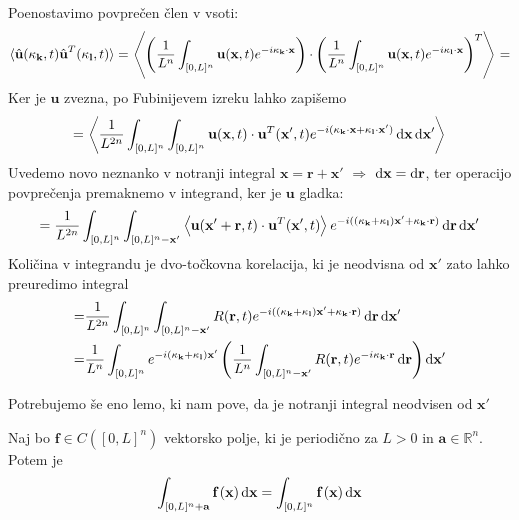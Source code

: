 \documentclass[mat2, tisk]{fmfdelo}
\newcommand{\R}{\mathbb R}
\newcommand{\bd}{\textbf}
\begin{document}
Poenostavimo povprečen člen v vsoti: 
\begin{align*}
  \langle \hat{\bd{u}}(\bd{\text{$\kappa$}}_\bd{k}, t) \hat{\bd{u}}^T(\bd{\text{$\kappa$}}_\bd{l}, t) \rangle = \left\langle \left(\frac{1}{L^n} \int_{[0, L]^n} \bd{u}(\bd{x}, t) e^{-i\bd{\text{$\kappa$}}_{\bd{k}}\cdot \bd{x}} \right) \cdot \left(\frac{1}{L^n} \int_{[0, L]^n} \bd{u}(\bd{x}, t) e^{-i\bd{\text{$\kappa$}}_\bd{l} \cdot \bd{x}} \right)^T \right\rangle = 
\end{align*}
Ker je $\bd{u}$ zvezna, po Fubinijevem izreku lahko zapišemo 
\begin{align*}
= \left\langle \frac{1}{L^{2n}} \int_{[0, L]^{n}} \int_{[0, L]^{n}} \bd{u}(\bd{x}, t) \cdot \bd{u}^T(\bd{x}', t) e^{-i(\bd{\text{$\kappa$}}_{\bd{k}}\cdot \bd{x} + \bd{\text{$\kappa$}}_{\bd{l}}\cdot \bd{x}')} \dif\bd{x} \dif\bd{x}' \right\rangle
\end{align*}
Uvedemo novo neznanko v notranji integral $\bd{x} = \bd{r} + \bd{x}'$ $\Longrightarrow$ $\dif\bd{x} = \dif\bd{r}$, ter operacijo povprečenja premaknemo v integrand, ker 
je $\bd{u}$ gladka:
\begin{align*}
= \frac{1}{L^{2n}} \int_{[0, L]^{n}} \int_{[0, L]^{n} - \bd{x}'} \left\langle\bd{u}(\bd{x}' + \bd{r}, t) \cdot \bd{u}^T(\bd{x}', t)\right\rangle  e^{-i((\bd{\text{$\kappa$}}_{\bd{k}} + \bd{\text{$\kappa$}}_{\bd{l}})\bd{x}' + \bd{\text{$\kappa$}}_{\bd{k}} \cdot \bd{r})} \dif\bd{r} \dif\bd{x}' 
\end{align*}
Količina v integrandu je dvo-točkovna korelacija, ki je neodvisna od $\bd{x}'$
zato lahko preuredimo integral 
\begin{align*}
  =& \frac{1}{L^{2n}} \int_{[0, L]^{n}} \int_{[0, L]^{n} - \bd{x}'} R(\bd{r}, t) e^{-i((\bd{\text{$\kappa$}}_{\bd{k}} + \bd{\text{$\kappa$}}_{\bd{l}})\bd{x}' + \bd{\text{$\kappa$}}_{\bd{k}} \cdot \bd{r})} \dif\bd{r} \dif\bd{x}' \\
  =& \frac{1}{L^{n}} \int_{[0, L]^{n}} e^{-i(\bd{\text{$\kappa$}}_{\bd{k}} + \bd{\text{$\kappa$}}_{\bd{l}})\bd{x}'}\left(\frac{1}{L^n}\int_{[0, L]^{n} - \bd{x}'} R(\bd{r}, t) e^{-i\bd{\text{$\kappa$}}_{\bd{k}} \cdot \bd{r}} \dif\bd{r}\right) \dif\bd{x}'
\end{align*}

Potrebujemo še eno lemo, ki nam pove, da je notranji integral 
neodvisen od $\bd{x}'$

\begin{lema}
Naj bo $\bd{f} \in C([0, L]^n)$ vektorsko polje, ki je periodično za 
$L>0$ in $\bd{a}\in \R^n$. Potem je 
\begin{equation*}
\int_{[0, L]^n + \bd{a}}\bd{f}\,(\bd{x}) \dif\bd{x} = \int_{[0, L]^n} \bd{f}\,(\bd{x}) \dif\bd{x}
\end{equation*} 
\end{lema}
\end{document}
